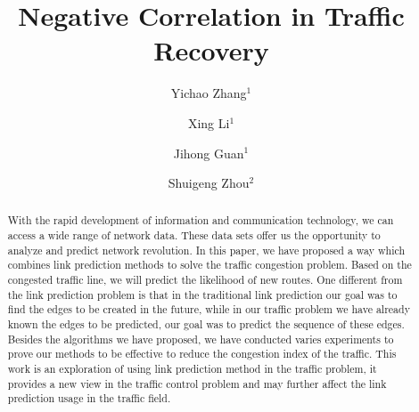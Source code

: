 \documentclass[onecolumn,preprintnumbers,amsmath,amssymb]{revtex4}
\begin{document}
\title{Negative Correlation in Traffic Recovery}

\author{Yichao Zhang$^{1}$}

\author{Xing Li$^{1}$}


\author{Jihong Guan$^{1}$}


\author{Shuigeng Zhou$^{2}$}



\begin{abstract}
With the rapid development of information and communication technology, we can access a wide range of network data. These data sets offer us the opportunity to analyze and predict network revolution. In this paper, we have proposed a way which combines link prediction methods to solve the traffic congestion problem. Based on the congested traffic line, we will predict the likelihood of new routes. One different from the link prediction problem is that in the traditional link prediction our goal was to find the edges to be created in the future, while in our traffic problem we have already known the edges to be predicted, our goal was to predict the sequence of these edges. Besides the algorithms we have proposed, we have conducted varies experiments to prove our methods to be effective to reduce the congestion index of the traffic. This work is an exploration of using link prediction method in the traffic problem, it provides a new view in the traffic control problem and may further affect the link prediction usage in the traffic field. 
\end{abstract}


\maketitle
\end{document}

